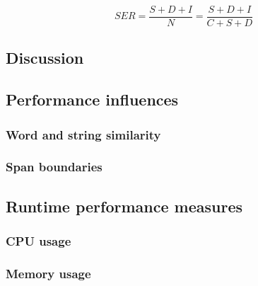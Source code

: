 \begin{displaymath}
	SER = \frac{S+D+I}{N} = \frac{S+D+I}{C+S+D}
\end{displaymath}

\subsection{Discussion}

\subsection{Performance influences}

\subsubsection{Word and string similarity}
\subsubsection{Span boundaries}

\subsection{Runtime performance measures}

\subsubsection{CPU usage}
\subsubsection{Memory usage}